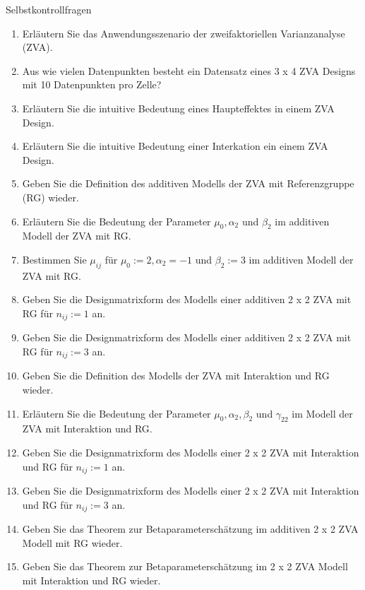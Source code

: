 \documentclass[
  8pt,
  ignorenonframetext,
]{beamer}
\begin{document}
\begin{frame}{Selbstkontrollfragen}
\protect\hypertarget{selbstkontrollfragen}{}
\footnotesize
\begin{enumerate}
\justifying
\item Erläutern Sie das Anwendungsszenario der zweifaktoriellen Varianzanalyse (ZVA).
\item Aus wie vielen Datenpunkten besteht ein Datensatz eines 3 x 4 ZVA Designs mit 10 Datenpunkten pro Zelle? 
\item Erläutern Sie die intuitive Bedeutung eines Haupteffektes in einem ZVA Design.
\item Erläutern Sie die intuitive Bedeutung einer Interkation ein einem ZVA Design.
\item Geben Sie die Definition des additiven Modells der ZVA mit Referenzgruppe (RG) wieder.
\item Erläutern Sie die Bedeutung der Parameter $\mu_0,\alpha_2$ und $\beta_2$ im additiven Modell der ZVA mit RG.
\item Bestimmen Sie $\mu_{ij}$ für $\mu_0 := 2,\alpha_2 = -1$ und $\beta_2 := 3$ im additiven Modell der ZVA mit RG.
\item Geben Sie die Designmatrixform des Modells einer additiven 2 x 2 ZVA mit RG für $n_{ij} := 1$ an.
\item Geben Sie die Designmatrixform des Modells einer additiven 2 x 2 ZVA mit RG für $n_{ij} := 3$ an.
\item Geben Sie die Definition des Modells der ZVA mit Interaktion und RG wieder.
\item Erläutern Sie die Bedeutung der Parameter $\mu_0,\alpha_2, \beta_2$ und $\gamma_{22}$ im Modell der ZVA mit Interaktion und RG.
\item Geben Sie die Designmatrixform des Modells einer 2 x 2 ZVA mit Interaktion und RG für $n_{ij} := 1$ an.
\item Geben Sie die Designmatrixform des Modells einer 2 x 2 ZVA mit Interaktion und RG für $n_{ij} := 3$ an.
\item Geben Sie das Theorem zur Betaparameterschätzung im additiven 2 x 2 ZVA Modell mit RG wieder.
\item Geben Sie das Theorem zur Betaparameterschätzung im 2 x 2 ZVA Modell mit Interaktion und RG wieder.
\end{enumerate}
\end{frame}
\end{document}
